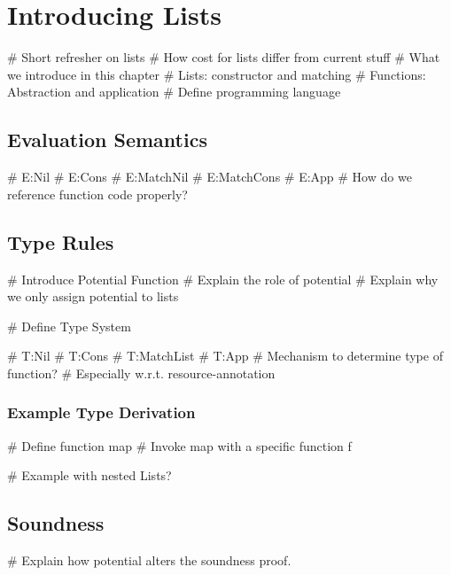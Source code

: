 \chapter{Introducing Lists}
# Short refresher on lists
# How cost for lists differ from current stuff
# What we introduce in this chapter
   # Lists: constructor and matching
   # Functions: Abstraction and application
# Define programming language


\section{Evaluation Semantics}
# E:Nil
# E:Cons 
# E:MatchNil
# E:MatchCons
# E:App
   # How do we reference function code properly?

\section{Type Rules}
# Introduce Potential Function
   # Explain the role of potential
   # Explain why we only assign potential to lists

# Define Type System

# T:Nil
# T:Cons
# T:MatchList
# T:App
   # Mechanism to determine type of function?
   # Especially w.r.t. resource-annotation

\subsection{Example Type Derivation}
# Define function map
# Invoke map with a specific function f

# Example with nested Lists?

\section{Soundness}

# Explain how potential alters the soundness proof.
